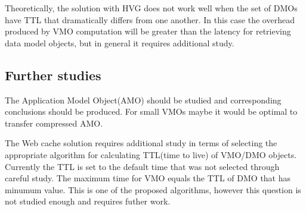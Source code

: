 Theoretically, the solution with HVG does not work well when the set of DMOs have TTL that dramatically differs from one another. In this case the overhead produced by VMO computation will be greater than the latency for retrieving data model objects, but in general it requires additional study. 

\subsection{Further studies}

The Application Model Object(AMO) should be studied and corresponding conclusions should be produced. For small VMOs maybe it would be optimal to transfer compressed AMO.

The Web cache solution requires additional study in terms of selecting the appropriate algorithm for calculating  TTL(time to live) of VMO/DMO objects. Currently the TTL is set to the default time that was not selected through careful study. The maximum time for VMO equals the TTL of DMO that has minumum value. This is one of the proposed algorithms, however this question is not studied enough and requires futher work.

\newpage
